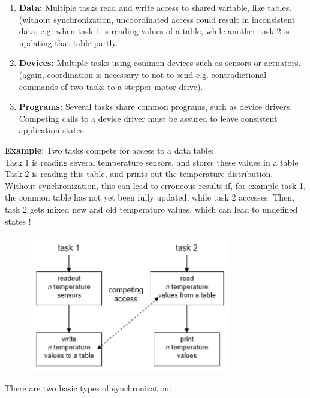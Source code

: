 \begin{enumerate}
	\item  \textbf{Data: }Multiple tasks read and write access to shared variable, like tables. (without synchronization, uncoordinated access could result in inconsistent data, e.g. when task 1 is reading values of a table, while another task 2 is updating that table partly.

	\item  \textbf{Devices: } Multiple tasks using common devices such as sensors or actuators. (again, coordination is necessary to not to send e.g. contradictional commands of two tasks to a stepper motor drive).

	\item  \textbf{Programs: } Several tasks share common programs, such as device drivers. Competing calls to a device driver must be assured to leave consistent application states.
\end{enumerate}
\os{\newpage}
\textbf{ Example}: Two tasks compete for access to a data table:\\

Task 1 is reading several temperature sensors, and stores these values in a table\\
Task 2 is reading this table, and prints out the temperature distribution.\\

Without synchronization, this can lead to erroneous results if, for example task 1, the common table has not yet been fully updated, while task 2 accesses. Then, task 2 gets mixed new and old temperature values, which can lead to undefined states !

 	\begin{figure}[h]
    \centering
    \includegraphics[width=9cm, height=6cm]{Images/image102.png}
    \label{fig:Fig 48}
    \end{figure}

\newpage  
There are two basic types of synchronization:

